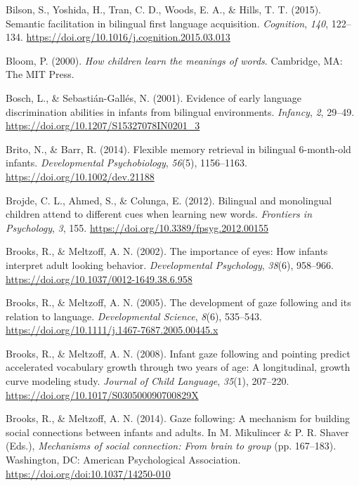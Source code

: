 \documentclass[
  english,
  ,man,floatsintext]{apa6}
\begin{document}
\leavevmode\hypertarget{ref-Bilson_etal_2015}{}%
Bilson, S., Yoshida, H., Tran, C. D., Woods, E. A., \& Hills, T. T. (2015). Semantic facilitation in bilingual first language acquisition. \emph{Cognition}, \emph{140}, 122--134. \url{https://doi.org/10.1016/j.cognition.2015.03.013}

\leavevmode\hypertarget{ref-Bloom_2000}{}%
Bloom, P. (2000). \emph{How children learn the meanings of words}. Cambridge, MA: The MIT Press.

\leavevmode\hypertarget{ref-Bosch_Sebastian-Galles_2001}{}%
Bosch, L., \& Sebastián-Gallés, N. (2001). Evidence of early language discrimination abilities in infants from bilingual environments. \emph{Infancy}, \emph{2}, 29--49. \url{https://doi.org/10.1207/S15327078IN0201_3}

\leavevmode\hypertarget{ref-Brito_Barr_2014}{}%
Brito, N., \& Barr, R. (2014). Flexible memory retrieval in bilingual 6-month-old infants. \emph{Developmental Psychobiology}, \emph{56}(5), 1156--1163. \url{https://doi.org/10.1002/dev.21188}

\leavevmode\hypertarget{ref-Brojde_etal_2012}{}%
Brojde, C. L., Ahmed, S., \& Colunga, E. (2012). Bilingual and monolingual children attend to different cues when learning new words. \emph{Frontiers in Psychology}, \emph{3}, 155. \url{https://doi.org/10.3389/fpsyg.2012.00155}

\leavevmode\hypertarget{ref-Brooks_Meltzoff_2002}{}%
Brooks, R., \& Meltzoff, A. N. (2002). The importance of eyes: How infants interpret adult looking behavior. \emph{Developmental Psychology}, \emph{38}(6), 958--966. \url{https://doi.org/10.1037/0012-1649.38.6.958}

\leavevmode\hypertarget{ref-Brooks_Meltzoff_2005}{}%
Brooks, R., \& Meltzoff, A. N. (2005). The development of gaze following and its relation to language. \emph{Developmental Science}, \emph{8}(6), 535--543. \url{https://doi.org/10.1111/j.1467-7687.2005.00445.x}

\leavevmode\hypertarget{ref-Brooks_Meltzoff_2008}{}%
Brooks, R., \& Meltzoff, A. N. (2008). Infant gaze following and pointing predict accelerated vocabulary growth through two years of age: A longitudinal, growth curve modeling study. \emph{Journal of Child Language}, \emph{35}(1), 207--220. \url{https://doi.org/10.1017/S030500090700829X}

\leavevmode\hypertarget{ref-Brooks_Meltzoff_2014}{}%
Brooks, R., \& Meltzoff, A. N. (2014). Gaze following: A mechanism for building social connections between infants and adults. In M. Mikulincer \& P. R. Shaver (Eds.), \emph{Mechanisms of social connection: From brain to group} (pp. 167--183). Washington, DC: American Psychological Association. \url{https://doi.org/doi:10.1037/14250-010}
\end{document}
